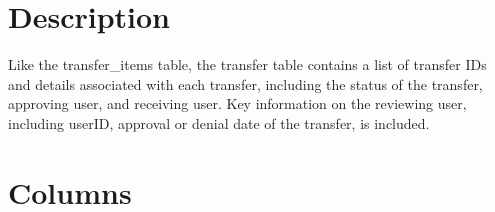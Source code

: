 \documentclass[
  letterpaper,
  DIV=11,
  numbers=noendperiod]{scrreprt}
\begin{document}
\hypertarget{description-40}{%
\section*{Description}\label{description-40}}

Like the transfer\_items table, the transfer table contains a list of
transfer IDs and details associated with each transfer, including the
status of the transfer, approving user, and receiving user. Key
information on the reviewing user, including userID, approval or denial
date of the transfer, is included.

\hypertarget{columns-40}{%
\section*{Columns}\label{columns-40}}
\end{document}
